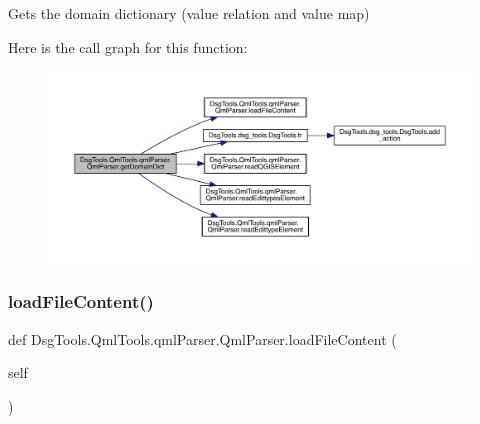 \begin{DoxyVerb}Gets the domain dictionary (value relation and value map)
\end{DoxyVerb}
 Here is the call graph for this function\+:
\nopagebreak
\begin{figure}[H]
\begin{center}
\leavevmode
\includegraphics[width=350pt]{class_dsg_tools_1_1_qml_tools_1_1qml_parser_1_1_qml_parser_ac9fb4cabff860abb0988781310f19ea9_cgraph}
\end{center}
\end{figure}
\mbox{\label{class_dsg_tools_1_1_qml_tools_1_1qml_parser_1_1_qml_parser_a11dae4c91d4e530b145265047b6f20de}} 
\subsubsection{\texorpdfstring{load\+File\+Content()}{loadFileContent()}}
{\footnotesize\ttfamily def Dsg\+Tools.\+Qml\+Tools.\+qml\+Parser.\+Qml\+Parser.\+load\+File\+Content (\begin{DoxyParamCaption}\item[{}]{self }\end{DoxyParamCaption})}

